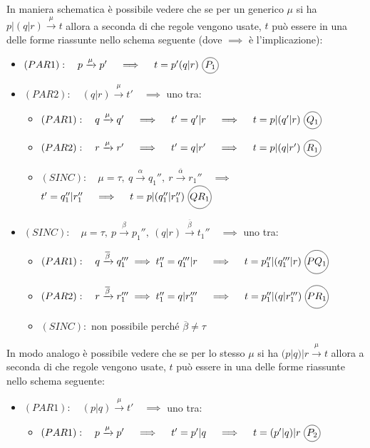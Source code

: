 \documentclass[a4paper,twosides]{report}
\newcommand\encircle[1]{%
  \tikz[baseline=(X.base)] 
    \node (X) [draw, shape=circle, inner sep=0] {\strut #1};}
\begin{document}
\begin{enumerate}
  In maniera schematica è
  possibile vedere che se per un generico $\mu$ si ha
  $p|(q|r)\xrightarrow{\mu}t$ allora a seconda di che regole vengono
  usate, $t$ pu\`o essere in una delle forme riassunte nello schema
  seguente (dove $\implies$ \`e l'implicazione):
  \begin{itemize}
  \item $(PAR1):\quad p\xrightarrow{\mu}p'\quad\implies\quad t=p'(q|r)\ \encircle{$P_1$}$
  \item $(PAR2):\quad (q|r)\xrightarrow{\mu}t'\quad\implies$ uno tra:
    \begin{itemize}
    \item $(PAR1):\quad q\xrightarrow{\mu}q'\quad\implies\quad t'=q'|r\quad\implies\quad t=p|(q'|r)\ \encircle{$Q_1$}$
    \item $(PAR2):\quad r\xrightarrow{\mu}r'\quad\implies\quad t'=q|r'\quad\implies\quad t=p|(q|r')\ \encircle{$R_1$}$
    \item $(SINC):\quad \mu=\tau,\ q\xrightarrow{\alpha}q_1'',\ r\xrightarrow{\overline{\alpha}}r_1''\quad\implies$\\
      \hbox{}\hfill$t'=q_1''|r_1''\quad\implies\quad t=p|(q_1''|r_1'')\ \encircle{$QR_1$}$
    \end{itemize}
  \item $(SINC):\quad \mu=\tau,\ p\xrightarrow{\beta}p_1'',\ (q|r)\xrightarrow{\overline{\beta}}t_1''\quad\implies$ uno tra:
    \begin{itemize}
    \item $(PAR1):\quad q\xrightarrow{\overline{\beta}}q_1'''\implies t_1''=q_1'''|r\quad\implies\quad t=p_1''|(q_1'''|r)\ \encircle{$PQ_1$}$
    \item $(PAR2):\quad r\xrightarrow{\overline{\beta}}r_1'''\implies t_1''=q|r_1'''\quad\implies\quad t=p_1''|(q|r_1''')\ \encircle{$PR_1$}$
    \item $(SINC):$ non possibile perch\'e $\overline{\beta}\neq\tau$
    \end{itemize}
  \end{itemize}
  In modo analogo \`e
  possibile vedere che se per lo stesso $\mu$ si ha
  $(p|q)|r\xrightarrow{\mu}t$ allora a seconda di che regole vengono
  usate, $t$ pu\`o essere in una delle forme riassunte nello schema
  seguente:
  \begin{itemize}
  \item $(PAR1):\quad (p|q)\xrightarrow{\mu}t'\quad\implies$ uno tra:
    \begin{itemize}
    \item $(PAR1):\quad p\xrightarrow{\mu}p'\quad\implies\quad t'=p'|q\quad\implies\quad t=(p'|q)|r\ \encircle{$P_2$}$

\end{itemize}
\end{itemize}
\end{enumerate}
\end{document}
